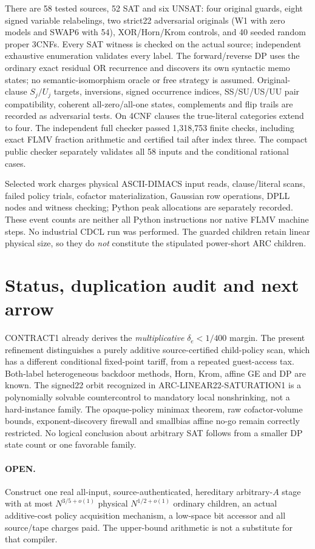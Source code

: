 \documentclass[11pt]{article}
\begin{document}
There are 58 tested sources, 52 SAT and six UNSAT:
four original guards, eight signed variable relabelings, two strict22
adversarial originals (W1 with zero models and SWAP6 with 54),
XOR/Horn/Krom controls, and 40 seeded random proper 3CNFs.
Every SAT witness is checked on the actual source; independent exhaustive
enumeration validates every label. The forward/reverse DP uses the
ordinary exact residual OR recurrence and discovers its own syntactic
memo states; no semantic-isomorphism oracle or free strategy is assumed.
Original-clause $S_j/U_j$ targets, inversions, signed occurrence indices,
SS/SU/US/UU pair compatibility, coherent all-zero/all-one states,
complements and flip trails are recorded as adversarial tests. On 4CNF
clauses the true-literal categories extend to four. The independent
full checker passed 1,318,753 finite checks, including exact FLMV
fraction arithmetic and certified tail after index three.
The compact public checker separately validates all 58 inputs and
the conditional rational cases.

Selected work charges physical ASCII-DIMACS input reads, clause/literal
scans, failed policy trials, cofactor materialization, Gaussian row
operations, DPLL nodes and witness checking; Python peak allocations
are separately recorded. These event counts are neither all Python
instructions nor native FLMV machine steps. No industrial CDCL run was
performed. The guarded children retain linear physical size, so they
do \emph{not} constitute the stipulated power-short ARC children.

\section{Status, duplication audit and next arrow}
CONTRACT1 already derives the \emph{multiplicative} $\delta_e<1/400$
margin. The present refinement distinguishes a purely additive
source-certified child-policy scan, which has a different conditional
fixed-point tariff, from a repeated guest-access tax. Both-label
heterogeneous backdoor methods, Horn, Krom, affine GE and DP are known.
The signed22 orbit recognized in ARC-LINEAR22-SATURATION1 is a
polynomially solvable countercontrol to mandatory local nonshrinking,
not a hard-instance family. The opaque-policy minimax theorem, raw
cofactor-volume bounds, exponent-discovery firewall and smallbias
affine no-go remain correctly restricted. No logical conclusion
about arbitrary SAT follows from a smaller DP state count or one
favorable family.

\paragraph{OPEN.} Construct one real all-input, source-authenticated,
hereditary arbitrary-$A$ stage with at most $N^{3/5+o(1)}$ physical
$N^{1/2+o(1)}$ ordinary children, an actual additive-cost policy
acquisition mechanism, a low-space bit accessor and all source/tape
charges paid. The upper-bound arithmetic is not a substitute for
that compiler.
\end{document}
